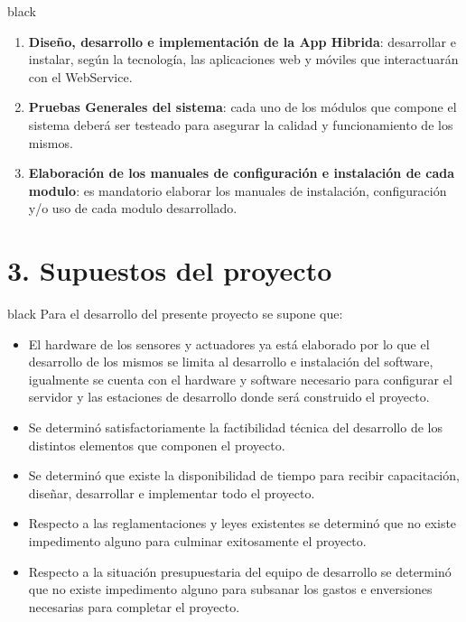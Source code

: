 \documentclass[11pt]{charter}
\begin{document}
\begin{consigna}{black}
\begin{enumerate}
	\item \textbf{Diseño, desarrollo e implementación de la App Hibrida}: desarrollar e instalar, según la tecnología, las aplicaciones web y móviles que interactuarán con el WebService.
	\item \textbf{Pruebas Generales del sistema}: cada uno de los módulos que compone el sistema deberá ser testeado para asegurar la calidad y funcionamiento de los mismos.
	\item \textbf{Elaboración de los manuales de configuración e instalación de cada modulo}: es mandatorio elaborar los manuales de instalación, configuración y/o uso de cada modulo desarrollado.
\end{enumerate}
\end{consigna}


\section{3. Supuestos del proyecto}
\label{sec:supuestos}

\begin{consigna}{black}
Para el desarrollo del presente proyecto se supone que: 

\begin{itemize}
	\item El hardware de los sensores y actuadores ya está elaborado por lo que el desarrollo de los mismos se limita al desarrollo e instalación del software, igualmente se cuenta con el hardware y software necesario para configurar el servidor y las estaciones de desarrollo donde será construido  el proyecto.
	\item Se determinó satisfactoriamente la factibilidad técnica del desarrollo de los distintos elementos que componen el proyecto.
	\item Se determinó que existe la disponibilidad de tiempo para recibir capacitación, diseñar, desarrollar e implementar todo el proyecto.
	\item Respecto a las reglamentaciones y leyes existentes se determinó que no existe impedimento alguno para culminar exitosamente el proyecto.
	\item Respecto a la situación presupuestaria del equipo de desarrollo se determinó que no existe impedimento alguno para subsanar los gastos e enversiones necesarias para completar el proyecto.
\end{itemize}
%
\end{consigna}
\end{document}
